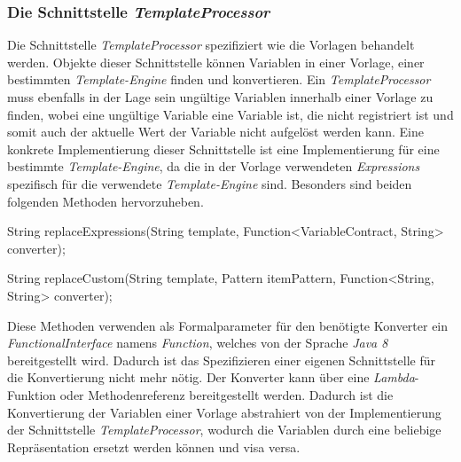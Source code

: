 \subsubsection{Die Schnittstelle \emph{TemplateProcessor}}
\label{sec:templateProcessor}
Die Schnittstelle \emph{TemplateProcessor} spezifiziert wie die Vorlagen behandelt werden. Objekte dieser Schnittstelle können Variablen in einer Vorlage, einer bestimmten \emph{Template-Engine} finden und konvertieren. Ein \emph{TemplateProcessor} muss ebenfalls in der Lage sein ungültige Variablen innerhalb einer Vorlage zu finden, wobei eine ungültige Variable eine Variable ist, die nicht registriert ist und somit auch der aktuelle Wert der Variable nicht aufgelöst werden kann.
\newline
\newline
Eine konkrete Implementierung dieser Schnittstelle ist eine Implementierung für eine bestimmte \emph{Template-Engine}, da die in der Vorlage verwendeten \emph{Expressions} spezifisch für die verwendete \emph{Template-Engine} sind. 
\newline
\newline
Besonders sind beiden folgenden Methoden hervorzuheben.
\begin{JavaCode}[numbers=none]
String replaceExpressions(String template,
                          Function<VariableContract, String> converter);

String replaceCustom(String template,
                     Pattern itemPattern,
                     Function<String, String> converter);
\end{JavaCode}
Diese Methoden verwenden als Formalparameter für den benötigte Konverter ein \emph{FunctionalInterface} namens \emph{Function}, welches von der Sprache \emph{Java 8} bereitgestellt wird. Dadurch ist das Spezifizieren einer eigenen Schnittstelle für die Konvertierung nicht mehr nötig. Der Konverter kann über eine \emph{Lambda}-Funktion oder Methodenreferenz bereitgestellt werden. Dadurch ist die Konvertierung der Variablen einer Vorlage abstrahiert von der Implementierung der Schnittstelle \emph{TemplateProcessor}, wodurch die Variablen durch eine beliebige Repräsentation ersetzt werden können und visa versa.
\newpage

